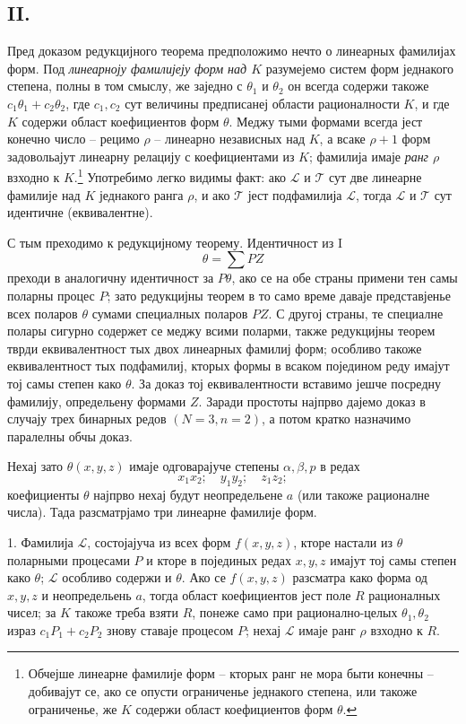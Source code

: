 \documentclass[11pt]{article}
\begin{document}
\subsection*{II.}
Пред доказом редукцијного теорема предположимо нечто о линеарных фамилијах форм. Под {\itshape линеарноју фамилијеју форм над $K$} разумејемо систем форм једнакого степена, полны в том смыслу, же заједно с $\theta_1$ и $\theta_2$ он всегда содержи такоже $c_1\theta_1+c_2\theta_2$, где $c_1,c_2$ сут величины предписанеј области рационалности $K$, и где $K$ содержи област коефициентов форм $\theta$. Меджу тыми формами всегда јест конечно число -- рецимо $\rho$ -- линеарно независных над $K$, а всаке $\rho+1$ форм задовольајут линеарну релацију с коефициентами из $K$; фамилија имаје {\itshape ранг $\rho$} взходно к $K$.\footnote{Обчејше линеарне фамилије форм -- кторых ранг не мора быти конечны -- добивајут се, ако се опусти ограниченье једнакого степена, или такоже ограниченье, же $K$ содержи област коефициентов форм $\theta$.} Употребимо легко видимы факт: ако $\mathcal L$ и $\mathcal T$ сут две линеарне фамилије над $K$ једнакого ранга $\rho$, и ако $\mathcal T$ јест подфамилија $\mathcal L$, тогда $\mathcal L$ и $\mathcal T$ сут идентичне (еквивалентне).

С тым преходимо к редукцијному теорему. Идентичност из I
\[
  \theta=\sum PZ
\]
преходи в аналогичну идентичност за $P\theta$, ако се на обе страны примени тен самы поларны процес $P$; зато редукцијны теорем в то само време даваје представјенье всех поларов $\theta$ сумами специалных поларов $PZ$. С другој страны, те специалне полары сигурно содержет се меджу всими поларми, также редукцијны теорем тврди еквивалентност тых двох линеарных фамилиј форм; особливо такоже еквивалентност тых подфамилиј, кторых формы в всаком поједином реду имајут тој самы степен како $\theta$. За доказ тој еквивалентности вставимо јешче посредну фамилију, определьену формами $Z$. Заради простоты најпрво дајемо доказ в случају трех бинарных редов $(N=3,n=2)$, а потом кратко назначимо паралелны обчы доказ.

Нехај зато $\theta(x,y,z)$ имаје одговарајуче степены $\alpha,\beta,p$ в редах
\[
  x_1x_2;\quad y_1y_2;\quad z_1z_2;
\]
коефициенты $\theta$ најпрво нехај будут неопредельене $a$ (или такоже рационалне числа). Тада разсматрјамо три линеарне фамилије форм.

1. Фамилија $\mathcal L$, состојајуча из всех форм $f(x,y,z)$, кторе настали из $\theta$ поларными процесами $P$ и кторе в појединых редах $x,y,z$ имајут тој самы степен како $\theta$; $\mathcal L$ особливо содержи и $\theta$. Ако се $f(x,y,z)$ разсматра како форма од $x,y,z$ и неопредельень $a$, тогда област коефициентов јест поле $R$ рационалных чисел; за $K$ такоже треба взяти $R$, понеже само при рационално-целых $\theta_1,\theta_2$ израз $c_1P_1+c_2P_2$ знову ставаје процесом $P$; нехај $\mathcal L$ имаје ранг $\rho$ взходно к $R$.
\end{document}
